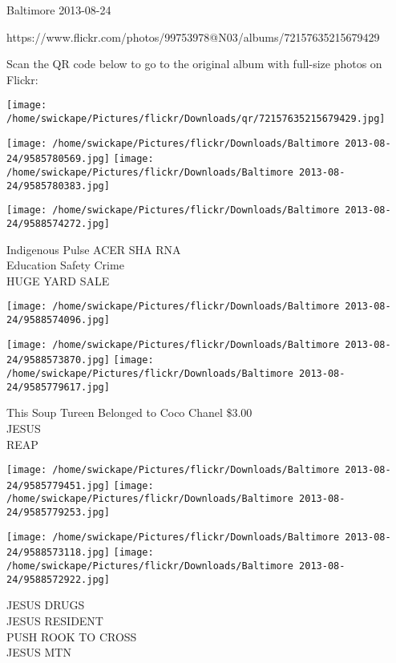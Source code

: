 \documentclass[10pt,letterpaper]{article}
\begin{document}
Baltimore 2013-08-24

https://www.flickr.com/photos/99753978@N03/albums/72157635215679429

Scan the QR code below to go to the original album with full-size photos on Flickr:

\texttt{[image: /home/swickape/Pictures/flickr/Downloads/qr/72157635215679429.jpg]}
\pagebreak

\texttt{[image: /home/swickape/Pictures/flickr/Downloads/Baltimore 2013-08-24/9585780569.jpg]}
\texttt{[image: /home/swickape/Pictures/flickr/Downloads/Baltimore 2013-08-24/9585780383.jpg]}

\texttt{[image: /home/swickape/Pictures/flickr/Downloads/Baltimore 2013-08-24/9588574272.jpg]}

Indigenous Pulse ACER SHA RNA\\
Education Safety Crime\\
HUGE YARD SALE\\
\pagebreak

\texttt{[image: /home/swickape/Pictures/flickr/Downloads/Baltimore 2013-08-24/9588574096.jpg]}

\vspace{0.25in}
\texttt{[image: /home/swickape/Pictures/flickr/Downloads/Baltimore 2013-08-24/9588573870.jpg]}
\texttt{[image: /home/swickape/Pictures/flickr/Downloads/Baltimore 2013-08-24/9585779617.jpg]}

This Soup Tureen Belonged to Coco Chanel \$3.00\\
JESUS\\
REAP\\
\pagebreak

\texttt{[image: /home/swickape/Pictures/flickr/Downloads/Baltimore 2013-08-24/9585779451.jpg]}
\texttt{[image: /home/swickape/Pictures/flickr/Downloads/Baltimore 2013-08-24/9585779253.jpg]}

\texttt{[image: /home/swickape/Pictures/flickr/Downloads/Baltimore 2013-08-24/9588573118.jpg]}
\texttt{[image: /home/swickape/Pictures/flickr/Downloads/Baltimore 2013-08-24/9588572922.jpg]}

JESUS DRUGS\\
JESUS RESIDENT\\
PUSH ROOK TO CROSS\\
JESUS MTN\\
\pagebreak
\end{document}

